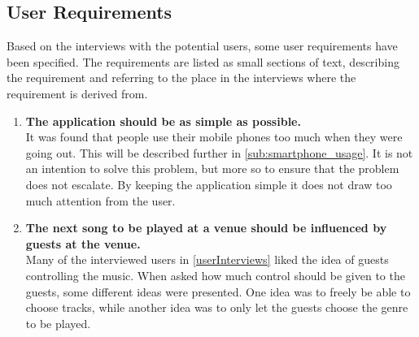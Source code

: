 \subsection{User Requirements}
\label{sub:user_requirements}

Based on the interviews with the potential users, some user requirements have been specified. The requirements are listed as small sections of text, describing the requirement and referring to the place in the interviews where the requirement is derived from.

\begin{enumerate}
    \item \textbf{The application should be as simple as possible.}\\
        It was found that people use their mobile phones too much when they were going out. This will be described further in \cref{sub:smartphone_usage}. It is not an intention to solve this problem, but more so to ensure that the problem does not escalate. By keeping the application simple it does not draw too much attention from the user.
    \item \textbf{The next song to be played at a venue should be influenced by guests at the venue.} \\
      Many of the interviewed users in \cref{userInterviews} liked the idea of guests controlling the music. When asked how much control should be given to the guests, some different ideas were presented. One idea was to freely be able to choose tracks, while another idea was to only let the guests choose the genre to be played.
\end{enumerate}
